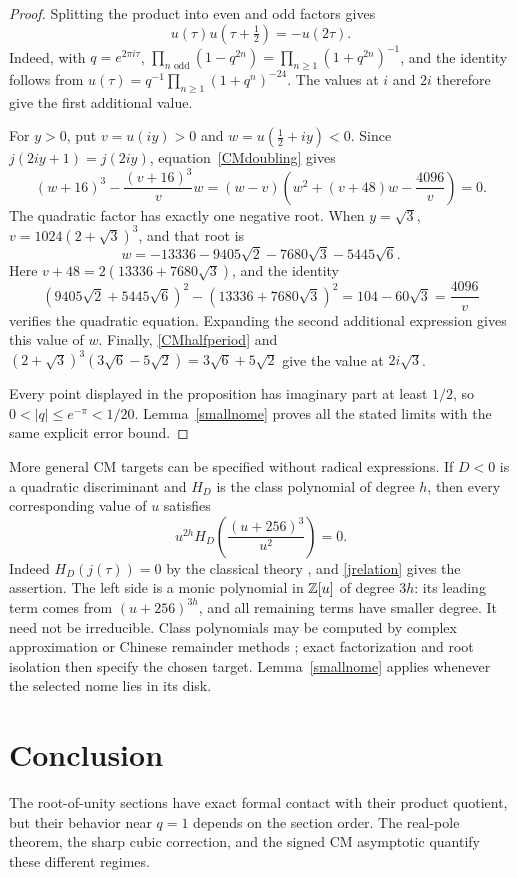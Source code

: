 \documentclass[11pt]{amsart}
\theoremstyle{definition}
\theoremstyle{remark}
\numberwithin{equation}{section}
\begin{document}
\begin{proof}
Splitting the product into even and odd factors gives
\begin{equation}\label{CMhalfperiod}
 u(\tau)u\left(\tau+\tfrac12\right)=-u(2\tau).
\end{equation}
Indeed, with $q=e^{2\pi i\tau}$,
$\prod_{n\text{ odd}}(1-q^{2n})
 =\prod_{n\ge1}(1+q^{2n})^{-1}$, and the identity follows from
$u(\tau)=q^{-1}\prod_{n\ge1}(1+q^n)^{-24}$.
The values at $i$ and $2i$ therefore give the first additional value.

For $y>0$, put $v=u(iy)>0$ and $w=u(\tfrac12+iy)<0$.
Since $j(2iy+1)=j(2iy)$, equation~\eqref{CMdoubling} gives
\[
 (w+16)^3-\frac{(v+16)^3}{v}w
 =(w-v)\left(w^2+(v+48)w-\frac{4096}{v}\right)=0.
\]
The quadratic factor has exactly one negative root. When $y=\sqrt3$,
$v=1024(2+\sqrt3)^3$, and that root is
\[
 w=-13336-9405\sqrt2-7680\sqrt3-5445\sqrt6.
\]
Here $v+48=2(13336+7680\sqrt3)$, and the identity
\[
 (9405\sqrt2+5445\sqrt6)^2-(13336+7680\sqrt3)^2
 =104-60\sqrt3=\frac{4096}{v}
\]
verifies the quadratic equation. Expanding the second additional expression gives this value of $w$.
Finally, \eqref{CMhalfperiod} and
$(2+\sqrt3)^3(3\sqrt6-5\sqrt2)=3\sqrt6+5\sqrt2$
give the value at $2i\sqrt3$.

Every point displayed in the proposition has imaginary part at least
$1/2$, so $0<|q|\le e^{-\pi}<1/20$.
Lemma~\ref{smallnome} proves all the stated limits with the same explicit
error bound.
\end{proof}

More general CM targets can be specified without radical expressions. If $D<0$ is a quadratic discriminant and $H_D$ is the class polynomial of degree $h$, then every corresponding value of $u$ satisfies
\begin{equation}\label{classpoly}
 u^{2h}H_D\!\left(\frac{(u+256)^3}{u^2}\right)=0.
\end{equation}
Indeed $H_D(j(\tau))=0$ by the classical theory \cite{Cox}, and \eqref{jrelation} gives the assertion. The left side is a monic polynomial in $\mathbb Z[u]$ of degree $3h$: its leading term comes from $(u+256)^{3h}$, and all remaining terms have smaller degree. It need not be irreducible. Class polynomials may be computed by complex approximation or Chinese remainder methods \cite{Enge,Sutherland}; exact factorization and root isolation then specify the chosen target. Lemma~\ref{smallnome} applies whenever the selected nome lies in its disk.

\section*{Conclusion}
The root-of-unity sections have exact formal contact with their product
quotient, but their behavior near $q=1$ depends on the section order.
The real-pole theorem, the sharp cubic correction, and the signed CM
asymptotic quantify these different regimes.
\end{document}

